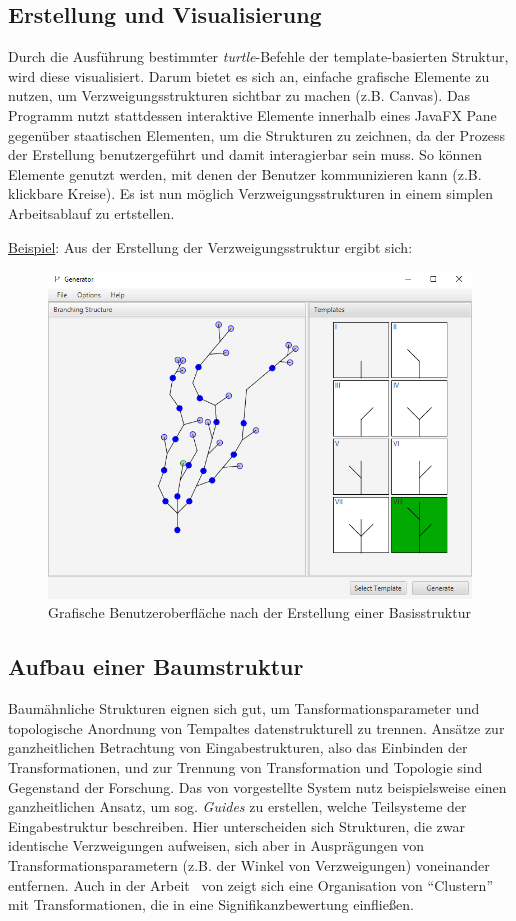 \subsection*{Erstellung und Visualisierung}
Durch die Ausführung bestimmter \textit{turtle}-Befehle der template-basierten Struktur, wird diese visualisiert.
Darum bietet es sich an, einfache grafische Elemente zu nutzen, um Verzweigungsstrukturen sichtbar zu machen
(z.B. Canvas).
Das Programm nutzt stattdessen interaktive Elemente innerhalb eines JavaFX Pane gegenüber staatischen Elementen, um
die Strukturen zu zeichnen, da der Prozess der Erstellung benutzergeführt und damit interagierbar sein muss.
So können Elemente genutzt werden, mit denen der Benutzer kommunizieren kann (z.B. klickbare Kreise).
Es ist nun möglich Verzweigungsstrukturen in einem simplen Arbeitsablauf zu ertstellen.

\newpage

\underline{Beispiel}: Aus der Erstellung der Verzweigungsstruktur ergibt sich:
\begin{figure}[H]
    \centering
    \includegraphics[width=12cm]{../images/evaluierung_inferrieren.png}
    \caption{Grafische Benutzeroberfläche nach der Erstellung einer Basisstruktur}
\end{figure}

\subsection*{Aufbau einer Baumstruktur}
Baumähnliche Strukturen eignen sich gut, um Tansformationsparameter und topologische Anordnung von Tempaltes
datenstrukturell zu trennen.
Ansätze zur ganzheitlichen Betrachtung von Eingabestrukturen, also das Einbinden der Transformationen,
und zur Trennung von Transformation und Topologie sind Gegenstand der Forschung.
Das von \citeauthor{benes_2011} vorgestellte System nutz beispielsweise einen ganzheitlichen Ansatz, um sog.
\textit{Guides} zu erstellen, welche Teilsysteme der Eingabestruktur beschreiben.
Hier unterscheiden sich Strukturen, die zwar identische Verzweigungen aufweisen, sich aber in Ausprägungen
von Transformationsparametern (z.B. der Winkel von Verzweigungen) voneinander entfernen.
Auch in der Arbeit~\cite{stava_2010} von \citeauthor{stava_2010} zeigt sich eine Organisation von
"`Clustern"' mit Transformationen, die in eine Signifikanzbewertung einfließen.

